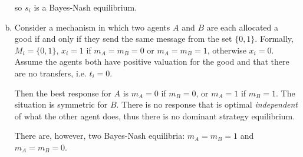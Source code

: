 \documentclass{article}
\begin{document}
\begin{enumerate}[(a)]
	so $s_i$ is a Bayes-Nash equilibrium.

	\item

	Consider a mechanism in which two agents $A$ and $B$ are each allocated a good if and only if they send the same message from the set $\{ 0, 1 \}$. Formally, $M_i = \{0, 1\}$, $x_i = 1$ if $m_A = m_B = 0$ or $m_A = m_B = 1$, otherwise $x_i = 0$. Assume the agents both have positive valuation for the good and that there are no transfers, i.e. $t_i = 0$.

	Then the best response for $A$ is $m_A = 0$ if $m_B = 0$, or $m_A = 1$ if $m_B = 1$. The situation is symmetric for $B$. There is no response that is optimal \textit{independent} of what the other agent does, thus there is no dominant strategy equilibrium.

	There are, however, two Bayes-Nash equilibria: $m_A = m_B = 1$ and $m_A = m_B = 0$.

\end{enumerate}
\end{document}

